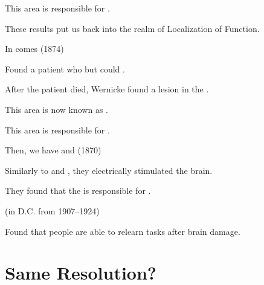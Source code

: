 \begin{coloredlist}
\begin{coloredlist}
        \item This area is responsible for .
        \item These results put us back into the realm of Localization of Function.
    \end{coloredlist}
    \item In comes  (1874)
    \begin{coloredlist}
        \item Found a patient who  but could .
        \item After the patient died, Wernicke found a lesion in the .
        \item This area is now known as .
        \item This area is responsible for .
    \end{coloredlist}
    \item Then, we have  and  (1870)
    \begin{coloredlist}
        \item Similarly to  and , they electrically stimulated the brain.
        \item They found that the  is responsible for .
    \end{coloredlist}
    \item {} (in D.C. from 1907--1924)
    \begin{coloredlist}
        \item Found that people are able to relearn tasks after brain damage.
    \end{coloredlist}
\end{coloredlist}

\section{Same Resolution?}

